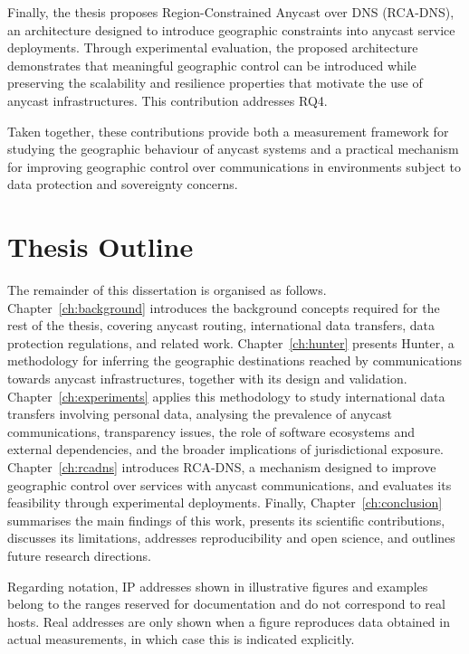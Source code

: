 Finally, the thesis proposes Region-Constrained Anycast over DNS (RCA-DNS), an architecture designed to introduce geographic constraints into anycast service deployments. Through experimental evaluation, the proposed architecture demonstrates that meaningful geographic control can be introduced while preserving the scalability and resilience properties that motivate the use of anycast infrastructures. This contribution addresses RQ4.

Taken together, these contributions provide both a measurement framework for studying the geographic behaviour of anycast systems and a practical mechanism for improving geographic control over communications in environments subject to data protection and sovereignty concerns.

\section{Thesis Outline}
\label{sc:introduction_outline}

The remainder of this dissertation is organised as follows. Chapter~\ref{ch:background} introduces the background concepts required for the rest of the thesis, covering anycast routing, international data transfers, data protection regulations, and related work. Chapter~\ref{ch:hunter} presents Hunter, a methodology for inferring the geographic destinations reached by communications towards anycast infrastructures, together with its design and validation. Chapter~\ref{ch:experiments} applies this methodology to study international data transfers involving personal data, analysing the prevalence of anycast communications, transparency issues, the role of software ecosystems and external dependencies, and the broader implications of jurisdictional exposure. Chapter~\ref{ch:rcadns} introduces RCA-DNS, a mechanism designed to improve geographic control over services with anycast communications, and evaluates its feasibility through experimental deployments. Finally, Chapter~\ref{ch:conclusion} summarises the main findings of this work, presents its scientific contributions, discusses its limitations, addresses reproducibility and open science, and outlines future research directions.

Regarding notation, IP addresses shown in illustrative figures and examples belong to the ranges reserved for documentation \cite{Arkko2010IPv4Documentation} and do not correspond to real hosts. Real addresses are only shown when a figure reproduces data obtained in actual measurements, in which case this is indicated explicitly.

